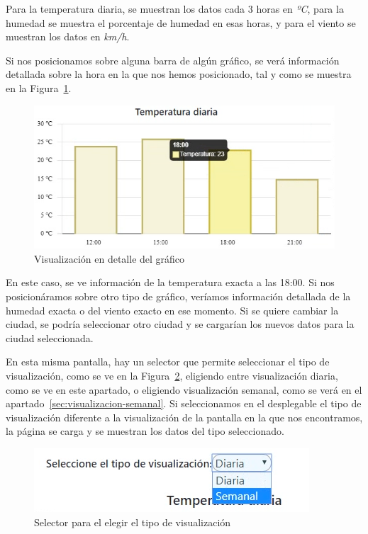 \documentclass[a4paper, 12pt]{book}
\begin{document}
\vspace{5mm}
Para la temperatura diaria, se muestran los datos cada 3 horas en \textit{ºC}, para la humedad se muestra el porcentaje de humedad en esas horas, y para el viento se muestran los datos en \textit{km/h}.

\vspace{5mm}
Si nos posicionamos sobre alguna barra de algún gráfico, se verá información detallada sobre la hora en la que nos hemos posicionado, tal y como se muestra en la Figura~\ref{fig:detalle_chart}.
\begin{figure}[h]
  \centering
  \includegraphics{img_usadas/detalle_chart.png}
  \caption{Visualización en detalle del gráfico}
  \label{fig:detalle_chart}
\end{figure}

En este caso, se ve información de la temperatura exacta a las 18:00. Si nos posicionáramos sobre otro tipo de gráfico, veríamos información detallada de la humedad exacta o del viento exacto en ese momento.
Si se quiere cambiar la ciudad, se podría seleccionar otro ciudad y se cargarían los nuevos datos para la ciudad seleccionada.

\vspace{5mm}
En esta misma pantalla, hay un selector que permite seleccionar el tipo de visualización, como se ve en la Figura~\ref{fig:seleccion_tipo}, eligiendo entre visualización diaria, como se ve en este apartado, o eligiendo visualización semanal, como se verá en el apartado~\ref{sec:visualizacion-semanal}.
Si seleccionamos en el desplegable el tipo de visualización diferente a la visualización de la pantalla en la que nos encontramos, la página se carga y se muestran los datos del tipo seleccionado.
\begin{figure}[h]
  \centering
  \includegraphics{img_usadas/seleccion_tipo.png}
  \caption{Selector para el elegir el tipo de visualización}
  \label{fig:seleccion_tipo}
\end{figure}
\end{document}
